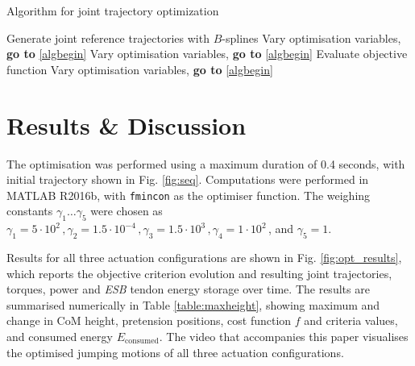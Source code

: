\documentclass[letterpaper, 10 pt, conference]{ieeeconf}  %
\begin{document}
\begin{algorithm}[ht]
	\caption{Algorithm for joint trajectory optimization} \label{algo}
	\begin{algorithmic}[1]
		\STATE Generate joint reference trajectories with $B$-splines \label{algbegin}
		\ELSE
			\STATE Vary optimisation variables, \textbf{go to} \ref{algbegin}
		\ENDIF
		\ENDWHILE
		\ELSE
			\STATE Vary optimisation variables, \textbf{go to} \ref{algbegin}
		\ENDIF
		\STATE Evaluate objective function
		\ELSE
			\STATE Vary optimisation variables, \textbf{go to} \ref{algbegin}
		\ENDIF
	\end{algorithmic}
\end{algorithm}


\section{Results \& Discussion} \label{sec:results}
The optimisation was performed using a maximum duration of 0.4 seconds, with initial trajectory shown in Fig. \ref{fig:seq}. Computations were performed in MATLAB R2016b, with \texttt{fmincon} as the optimiser function. The weighing constants $\gamma_1 \dots \gamma_5$ were chosen as $\gamma_1=5 \cdot 10^{2} \,, \gamma_2=1.5 \cdot 10^{-4} \,, \gamma_3=1.5 \cdot 10^{3} \,, \gamma_4 = 1\cdot 10^{2}\,$, and $\gamma_5 = 1$.

Results for all three actuation configurations are shown in Fig. \ref{fig:opt_results}, which reports the objective criterion evolution and resulting joint trajectories, torques, power and \textit{ESB} tendon energy storage over time. The results are summarised numerically in Table \ref{table:maxheight}, showing maximum and change in CoM height, pretension positions, cost function $f$ and criteria values, and consumed energy $E_{\text{consumed}}$. The video that accompanies this paper visualises the optimised jumping motions of all three actuation configurations.
\end{document}
